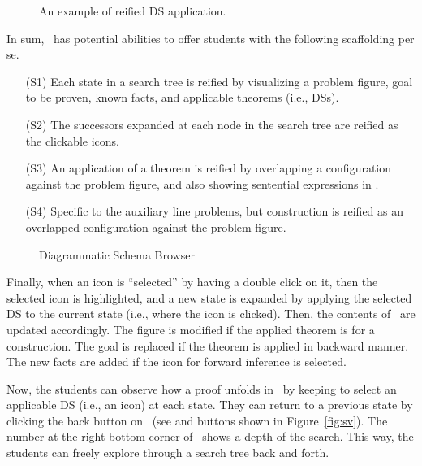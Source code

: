 \begin{figure}[tb]
 \center
 \caption{An example of reified DS application.}
 \label{fig:ov}
\end{figure}

In sum, \StateView\ has potential abilities to offer students with the
following scaffolding per se.

\begin{itemize}
 \item [(S1)] Each state in a search tree is reified by visualizing a
       problem figure, goal to be proven, known facts, and applicable
       theorems (i.e., DSs).
 \item [(S2)] The successors expanded at each node in the search tree
       are reified as the clickable icons.  
 \item [(S3)] An application of a theorem is reified by overlapping a
       configuration against the problem figure, and also showing
       sentential expressions in \DsBrowser.  
 \item [(S4)] Specific to the auxiliary line problems, but construction
       is reified as an overlapped configuration against the problem
       figure.  
\end{itemize}

\begin{figure}[tb]
 \center
 \caption{Diagrammatic Schema Browser}
 \label{fig:dsb}
\end{figure}

Finally, when an icon is ``selected'' by having a double click on it,
then the selected icon is highlighted, and a new state is expanded by
applying the selected DS to the current state (i.e., where the icon is
clicked).  Then, the contents of \StateView\ are updated accordingly.
The figure is modified if the applied theorem is for a construction.
The goal is replaced if the theorem is applied in backward manner.  The
new facts are added if the icon for forward inference is selected.  

Now, the students can observe how a proof unfolds in \StateView\ by
keeping to select an applicable DS (i.e., an icon) at each state.  They
can return to a previous state by clicking the back button on
\StateView\ (see  and  buttons
shown in Figure~\ref{fig:sv}).  The number at the right-bottom corner of
\StateView\ shows a depth of the search.  This way, the students can
freely explore through a search tree back and forth.

